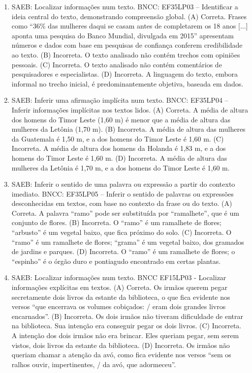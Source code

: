 \begin{enumerate}
\item
SAEB: Localizar informações num texto.
BNCC: EF35LP03 -- Identificar a ideia central do texto, demonstrando
compreensão global.
(A) Correta. Frases como ``36\% das mulheres daqui se casam
antes de completarem os 18 anos {[}...{]} aponta uma pesquisa do Banco
Mundial, divulgada em 2015'' apresentam números e dados com base em
pesquisas de confiança conferem credibilidade ao texto.
(B) Incorreta. O texto analisado não contém trechos com opiniões pessoais.
(C) Incorreta. O texto analisado não contém comentários de pesquisadores e especialistas.
(D)  Incorreta. A linguagem do texto, embora informal no trecho inicial,
é predominantemente objetiva, baseada em dados.

\item
SAEB: Inferir uma afirmação implícita num texto. BNCC: EF35LP04 -- Inferir informações implícitas nos textos lidos. 
(A) Correta. A média de altura dos homens do Timor Leste (1,60 m) é menor que a média de altura das mulheres da Letônia (1,70 m). 
(B) Incorreta. A média de altura das mulheres da Guatemala é 1,50 m, e a dos homens do Timor Leste é 1,60 m. 
(C) Incorreta. A média de altura dos homens da Holanda é 1,83 m, e a dos homens do Timor Leste é 1,60 m. 
(D) Incorreta. A média de altura das mulheres da Letônia é 1,70 m, e a dos homens do Timor Leste é 1,60 m.

\item
SAEB: Inferir o sentido de uma palavra ou expressão a partir do contexto imediato. BNCC: EF35LP05 -- Inferir o sentido de palavras ou expressões desconhecidas em textos, com base no contexto da frase ou do texto. 
(A) Correta. A palavra ``ramo'' pode ser substituída por ``ramalhete'', que é um conjunto de flores. 
(B) Incorreta. O ``ramo'' é um ramalhete de flores; ``arbusto'' é um vegetal baixo, que fica próximo do solo. 
(C) Incorreta. O ``ramo'' é um ramalhete de flores; ``grama'' é um vegetal baixo, dos gramados de jardins e parques. 
(D)  Incorreta. O ``ramo'' é um ramalhete de flores; o ``espinho'' é o órgão duro e pontiagudo encontrado em certas plantas.

\item
SAEB: Localizar informações num texto. BNCC EF15LP03 - Localizar informações explícitas em textos. 
(A) Correta. Os irmãos querem pegar secretamente dois livros da estante da biblioteca, o que fica evidente nos versos ``que encerrava os volumes cobiçados: / eram dois grandes livros encarnados''. 
(B) Incorreta. Os dois irmãos não tiveram dificuldade de entrar na biblioteca. Sua intenção era conseguir pegar os dois livros. 
(C) Incorreta. A intenção dos dois irmãos não era brincar. Eles queriam pegar, sem serem vistos, dois livros da estante da biblioteca. 
(D)  Incorreta. Os irmãos não queriam chamar a atenção da avó, como fica evidente nos versos ``sem os ralhos ouvir, impertinentes, / da avó, que adormeceu''.


\end{enumerate}
